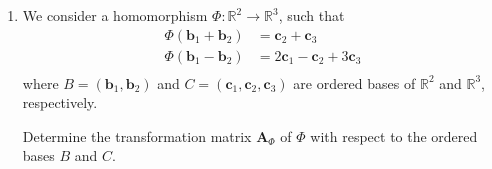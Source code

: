\documentclass[11pt]{article}
\newcommand{\R}{\mathbb{R}}
\newcommand{\mat}[1]{\mathbf{#1}}   %
\newcommand{\vect}[1]{\bm{#1}}      %
\theoremstyle{definition}
\theoremstyle{plain}
\theoremstyle{remark}
\begin{document}
\begin{enumerate}
\begin{enumerate}
\begin{enumerate}
                              \vspace{1em}
                              $\mat{P}_2$ is exactly the matrix above, with columns $\vect{c}_1, \vect{c}_2, \vect{c}_3$:
                              \[
                                  \mat{P}_2 =
                                  \begin{bmatrix}
                                      \begin{array}{@{}i{3}i{3}i{3}@{\;\;}}
                                          1  & 0  & 1  \\
                                          2  & -1 & 0  \\
                                          -1 & 2  & -1 \\
                                      \end{array}
                                  \end{bmatrix}
                              \]
                    \end{enumerate}

              \item[d.] We consider a homomorphism $\Phi : \R^2 \rightarrow \R^3$, such that
                    \[
                        \begin{aligned}
                            \Phi(\vect{b}_1 + \vect{b}_2) & = \vect{c}_2 + \vect{c}_3                  \\
                            \Phi(\vect{b}_1 - \vect{b}_2) & = 2 \vect{c}_1 - \vect{c}_2 + 3 \vect{c}_3 \\
                        \end{aligned}
                    \]
                    where $B = (\vect{b}_1, \vect{b}_2)$ and $C = (\vect{c}_1, \vect{c}_2, \vect{c}_3)$
                    are ordered bases of $\R^2$ and $\R^3$, respectively.

                    Determine the transformation matrix $\mat{A}_\Phi$ of $\Phi$ with respect to the ordered
                    bases $B$ and $C$.


\end{enumerate}
\end{enumerate}
\end{document}
